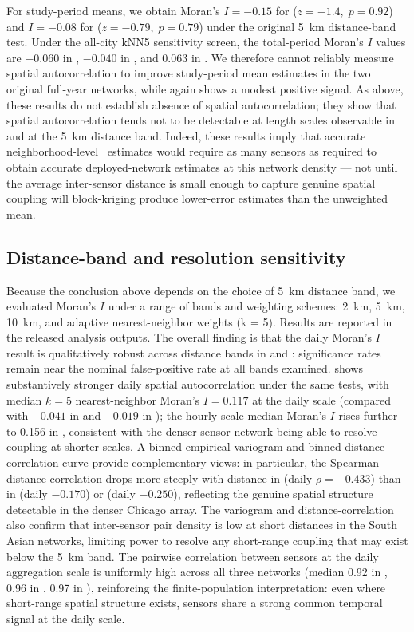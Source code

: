 For study-period means, we obtain Moran's $I = -0.15$ for  ($z=-1.4,\;p=0.92$) and $I = -0.08$ for  ($z=-0.79,\;p=0.79$) under the original 5~km distance-band test. Under the all-city kNN5 sensitivity screen, the total-period Moran's $I$ values are $-0.060$ in , $-0.040$ in , and 0.063 in . We therefore cannot reliably measure spatial autocorrelation to improve study-period mean estimates in the two original full-year networks, while  again shows a modest positive signal. As above, these results do not establish absence of spatial autocorrelation; they show that spatial autocorrelation tends not to be detectable at length scales observable in  and  at the 5~km distance band. Indeed, these results imply that accurate neighborhood-level \pmtt\ estimates would require as many sensors as required to obtain accurate deployed-network estimates at this network density --- not until the average inter-sensor distance is small enough to capture genuine spatial coupling will block-kriging produce lower-error estimates than the unweighted mean.

\subsection{Distance-band and resolution sensitivity}\label{sec:si_distance_band_sensitivity}

Because the conclusion above depends on the choice of 5~km distance band, we evaluated Moran's $I$ under a range of bands and weighting schemes: 2~km, 5~km, 10~km, and adaptive nearest-neighbor weights (k = 5). Results are reported in the released analysis outputs. The overall finding is that the daily Moran's $I$ result is qualitatively robust across distance bands in  and : significance rates remain near the nominal false-positive rate at all bands examined.  shows substantively stronger daily spatial autocorrelation under the same tests, with median $k=5$ nearest-neighbor Moran's $I = 0.117$ at the daily scale (compared with $-0.041$ in  and $-0.019$ in ); the hourly-scale median Moran's $I$ rises further to 0.156 in , consistent with the denser sensor network being able to resolve coupling at shorter scales. A binned empirical variogram and binned distance-correlation curve provide complementary views: in particular, the Spearman distance-correlation drops more steeply with distance in  (daily $\rho = -0.433$) than in  (daily $-0.170$) or  (daily $-0.250$), reflecting the genuine spatial structure detectable in the denser Chicago array. The variogram and distance-correlation also confirm that inter-sensor pair density is low at short distances in the South Asian networks, limiting power to resolve any short-range coupling that may exist below the 5~km band. The pairwise correlation between sensors at the daily aggregation scale is uniformly high across all three networks (median 0.92 in , 0.96 in , 0.97 in ), reinforcing the finite-population interpretation: even where short-range spatial structure exists, sensors share a strong common temporal signal at the daily scale.

